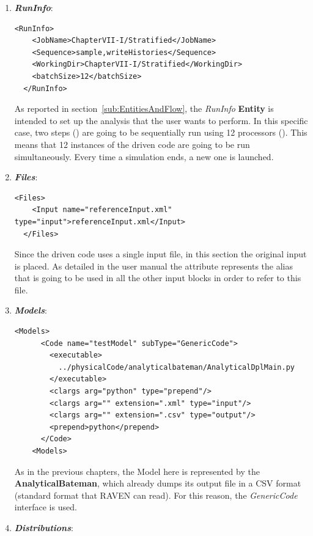 \begin{enumerate}
   \item \textbf{\textit{RunInfo}}:
\begin{lstlisting}[style=XML,morekeywords={arg,extension,pauseAtEnd,overwrite}]
  <RunInfo>
    <JobName>ChapterVII-I/Stratified</JobName>
    <Sequence>sample,writeHistories</Sequence>
    <WorkingDir>ChapterVII-I/Stratified</WorkingDir>
    <batchSize>12</batchSize>
  </RunInfo>
\end{lstlisting}   
   As reported in section~\ref{sub:EntitiesAndFlow}, the \textit{RunInfo} \textbf{Entity} is intended to set up the analysis 
   that the user wants to perform. In this specific case, two steps () are going to be sequentially run 
   using 12 processors (). This means that
   12 instances of the driven code are going to be run simultaneously. 
   Every time a simulation ends, a new one is launched.
   \item \textbf{\textit{Files}}:
\begin{lstlisting}[style=XML,morekeywords={arg,extension,pauseAtEnd,overwrite}]
  <Files>
    <Input name="referenceInput.xml" type="input">referenceInput.xml</Input>
  </Files>
\end{lstlisting}
   Since the driven code uses a single input file, in this section the original input is placed. As detailed in the user manual
   the attribute   represents the alias that is going to be used in all the other input blocks in order to refer to this file.
   \item \textbf{\textit{Models}}:
\begin{lstlisting}[style=XML,morekeywords={arg,extension,pauseAtEnd,overwrite}]
   <Models>
      <Code name="testModel" subType="GenericCode">
        <executable>
          ../physicalCode/analyticalbateman/AnalyticalDplMain.py
        </executable>
        <clargs arg="python" type="prepend"/>
        <clargs arg="" extension=".xml" type="input"/>
        <clargs arg="" extension=".csv" type="output"/>
        <prepend>python</prepend>
      </Code>
    <Models>
\end{lstlisting}
 As in the previous chapters, the Model here is represented by the 
 \textbf{AnalyticalBateman}, which already dumps its output file in a 
 CSV format (standard format that RAVEN can read). For this reason,
 the \textit{GenericCode} interface is used.
   \item \textbf{\textit{Distributions}}:
\begin{lstlisting}[style=XML,morekeywords={arg,extension,pauseAtEnd,overwrite}]

\end{lstlisting}
\end{enumerate}
